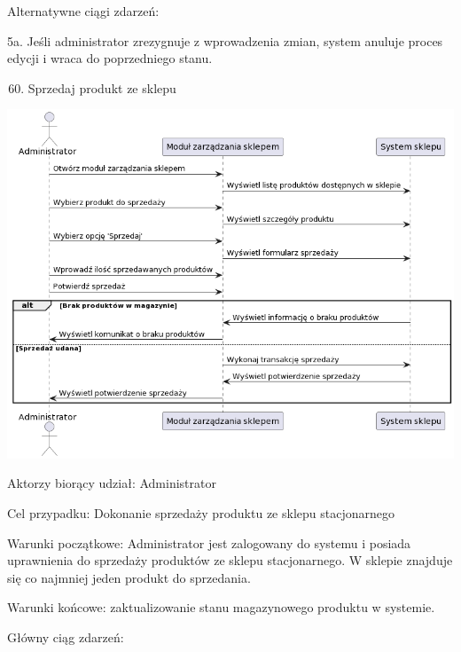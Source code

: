 \documentclass[
]{article}
\providecommand{\tightlist}{%
  \setlength{\itemsep}{0pt}\setlength{\parskip}{0pt}}
\begin{document}
{Alternatywne ciągi zdarzeń:}

{5a. Jeśli administrator zrezygnuje z wprowadzenia zmian, system anuluje
proces edycji i wraca do poprzedniego stanu.}

{}

\begin{enumerate}
\setcounter{enumi}{59}
\tightlist
\item
  {Sprzedaj produkt ze sklepu}
\end{enumerate}

{\includegraphics{diagrams/sequence/sklep_sprzedaj_produkt.png}}

{Aktorzy biorący udział: Administrator}

{Cel przypadku: Dokonanie sprzedaży produktu ze sklepu stacjonarnego}

{Warunki początkowe: Administrator jest zalogowany do systemu i posiada
uprawnienia do sprzedaży produktów ze sklepu stacjonarnego. W sklepie
znajduje się co najmniej jeden produkt do sprzedania.}

{Warunki końcowe: zaktualizowanie stanu magazynowego produktu w
systemie.}

{Główny ciąg zdarzeń:}
\end{document}
